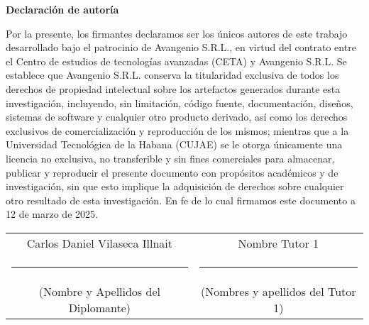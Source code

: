 {\Large \textbf{Declaración de autoría} \vspace{.3cm}}

Por la presente, los firmantes declaramos ser los únicos autores de este trabajo desarrollado bajo el patrocinio de Avangenio S.R.L., en virtud del contrato entre el Centro de estudios de tecnologías avanzadas (CETA) y Avangenio S.R.L. Se establece que Avangenio S.R.L. conserva la titularidad exclusiva de todos los derechos de propiedad intelectual sobre los artefactos generados durante esta investigación, incluyendo, sin limitación, código fuente, documentación, diseños, sistemas de software y cualquier otro producto derivado, así como los derechos exclusivos de comercialización y reproducción de los mismos; mientras que a la Universidad Tecnológica de la Habana (CUJAE) se le otorga únicamente una licencia no exclusiva, no transferible y sin fines comerciales para almacenar, publicar y reproducir el presente documento con propósitos académicos y de investigación, sin que esto implique la adquisición de derechos sobre cualquier otro resultado de esta investigación. En fe de lo cual firmamos este documento a 12 de marzo de 2025.

\vspace{3cm}

\begingroup	

\setlength{\tabcolsep}{10pt} %
\renewcommand{\arraystretch}{0.5} %
\centering
\begin{tabular}{c c}
	Carlos Daniel Vilaseca Illnait  & Nombre Tutor 1 \\
	\noindent\rule{6cm}{0.4pt} & \noindent\rule{6cm}{0.4pt} \\
	(Nombre y Apellidos del Diplomante) &  	(Nombres y apellidos del Tutor 1)	
\end{tabular}
\vspace{3cm}

\endgroup

